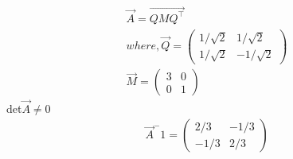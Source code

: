 \documentclass[journal]{IEEEtran}
\begin{document}
\begin{align}
    \vec{A}=\vec{QMQ^\top}\\
    where, \vec{Q}=\begin{pmatrix}
        1/\sqrt2 & 1/\sqrt2\\1/\sqrt2 &-1/\sqrt2
    \end{pmatrix}\\
    \vec{M}=\begin{pmatrix}
        3&0\\0&1
    \end{pmatrix}
\end{align}
det$\vec{A}$$\neq$0
\begin{align}
    \vec{A}^-1=\begin{pmatrix}
        2/3 & -1/3\\-1/3 &2/3
    \end{pmatrix}
    \end{align}
\end{document}
